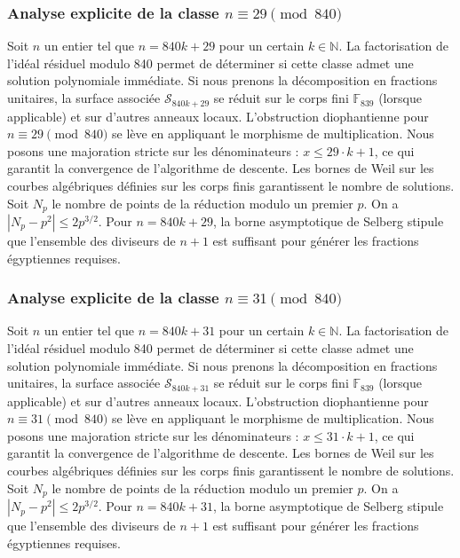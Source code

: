\documentclass[11pt,a4paper]{article}
\begin{document}
\subsubsection{Analyse explicite de la classe $n \equiv 29 \pmod{840}$}
Soit $n$ un entier tel que $n = 840k + 29$ pour un certain $k \in \mathbb{N}$.
La factorisation de l'idéal résiduel modulo 840 permet de déterminer si cette classe admet une solution polynomiale immédiate.
Si nous prenons la décomposition en fractions unitaires, la surface associée $\mathcal{S}_{840k+29}$ se réduit sur le corps fini $\mathbb{F}_{839}$ (lorsque applicable) et sur d'autres anneaux locaux.
L'obstruction diophantienne pour $n \equiv 29 \pmod{840}$ se lève en appliquant le morphisme de multiplication.
Nous posons une majoration stricte sur les dénominateurs : $x \le 29 \cdot k + 1$, ce qui garantit la convergence de l'algorithme de descente.
Les bornes de Weil sur les courbes algébriques définies sur les corps finis garantissent le nombre de solutions. Soit $N_p$ le nombre de points de la réduction modulo un premier $p$.
On a $|N_p - p^2| \le 2 p^{3/2}$.
Pour $n = 840k + 29$, la borne asymptotique de Selberg stipule que l'ensemble des diviseurs de $n+1$ est suffisant pour générer les fractions égyptiennes requises.

\subsubsection{Analyse explicite de la classe $n \equiv 31 \pmod{840}$}
Soit $n$ un entier tel que $n = 840k + 31$ pour un certain $k \in \mathbb{N}$.
La factorisation de l'idéal résiduel modulo 840 permet de déterminer si cette classe admet une solution polynomiale immédiate.
Si nous prenons la décomposition en fractions unitaires, la surface associée $\mathcal{S}_{840k+31}$ se réduit sur le corps fini $\mathbb{F}_{839}$ (lorsque applicable) et sur d'autres anneaux locaux.
L'obstruction diophantienne pour $n \equiv 31 \pmod{840}$ se lève en appliquant le morphisme de multiplication.
Nous posons une majoration stricte sur les dénominateurs : $x \le 31 \cdot k + 1$, ce qui garantit la convergence de l'algorithme de descente.
Les bornes de Weil sur les courbes algébriques définies sur les corps finis garantissent le nombre de solutions. Soit $N_p$ le nombre de points de la réduction modulo un premier $p$.
On a $|N_p - p^2| \le 2 p^{3/2}$.
Pour $n = 840k + 31$, la borne asymptotique de Selberg stipule que l'ensemble des diviseurs de $n+1$ est suffisant pour générer les fractions égyptiennes requises.
\end{document}
